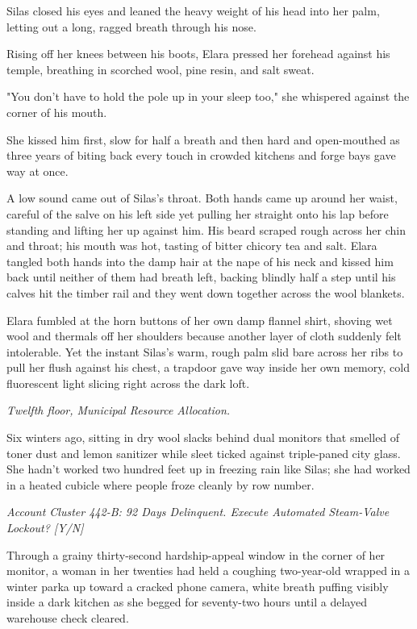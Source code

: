 Silas closed his eyes and leaned the heavy weight of his head into her palm, letting out a long, ragged breath through his nose.

Rising off her knees between his boots, Elara pressed her forehead against his temple, breathing in scorched wool, pine resin, and salt sweat.

"You don't have to hold the pole up in your sleep too," she whispered against the corner of his mouth.

She kissed him first, slow for half a breath and then hard and open-mouthed as three years of biting back every touch in crowded kitchens and forge bays gave way at once.

A low sound came out of Silas's throat. Both hands came up around her waist, careful of the salve on his left side yet pulling her straight onto his lap before standing and lifting her up against him. His beard scraped rough across her chin and throat; his mouth was hot, tasting of bitter chicory tea and salt. Elara tangled both hands into the damp hair at the nape of his neck and kissed him back until neither of them had breath left, backing blindly half a step until his calves hit the timber rail and they went down together across the wool blankets.

Elara fumbled at the horn buttons of her own damp flannel shirt, shoving wet wool and thermals off her shoulders because another layer of cloth suddenly felt intolerable. Yet the instant Silas's warm, rough palm slid bare across her ribs to pull her flush against his chest, a trapdoor gave way inside her own memory, cold fluorescent light slicing right across the dark loft.

\textit{Twelfth floor, Municipal Resource Allocation.}

Six winters ago, sitting in dry wool slacks behind dual monitors that smelled of toner dust and lemon sanitizer while sleet ticked against triple-paned city glass. She hadn't worked two hundred feet up in freezing rain like Silas; she had worked in a heated cubicle where people froze cleanly by row number.

\textit{Account Cluster 442-B: 92 Days Delinquent. Execute Automated Steam-Valve Lockout? [Y/N]}

Through a grainy thirty-second hardship-appeal window in the corner of her monitor, a woman in her twenties had held a coughing two-year-old wrapped in a winter parka up toward a cracked phone camera, white breath puffing visibly inside a dark kitchen as she begged for seventy-two hours until a delayed warehouse check cleared.

